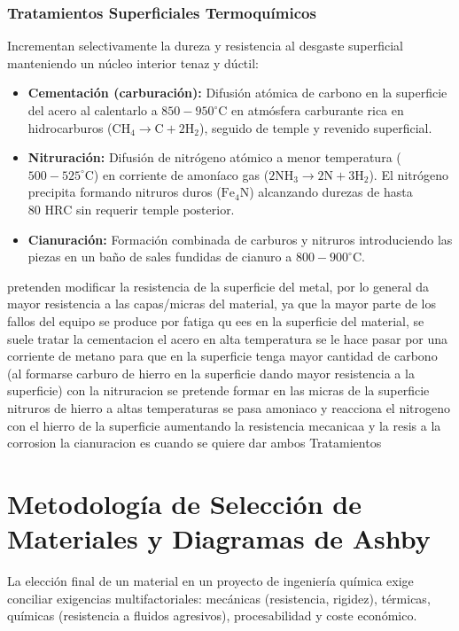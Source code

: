 \subsubsection{Tratamientos Superficiales Termoquímicos}
Incrementan selectivamente la dureza y resistencia al desgaste superficial manteniendo un núcleo interior tenaz y dúctil:
\begin{itemize}
    \item \textbf{Cementación (carburación):} Difusión atómica de carbono en la superficie del acero al calentarlo a $850 - 950^\circ\text{C}$ en atmósfera carburante rica en hidrocarburos ($\text{CH}_4 \rightarrow \text{C} + 2\text{H}_2$), seguido de temple y revenido superficial.
    \item \textbf{Nitruración:} Difusión de nitrógeno atómico a menor temperatura ($500 - 525^\circ\text{C}$) en corriente de amoníaco gas ($2\text{NH}_3 \rightarrow 2\text{N} + 3\text{H}_2$). El nitrógeno precipita formando nitruros duros ($\text{Fe}_4\text{N}$) alcanzando durezas de hasta $80\text{ HRC}$ sin requerir temple posterior.
    \item \textbf{Cianuración:} Formación combinada de carburos y nitruros introduciendo las piezas en un baño de sales fundidas de cianuro a $800 - 900^\circ\text{C}$.
\end{itemize}
pretenden modificar la resistencia de la superficie del metal, por lo general da mayor resistencia a las capas/micras del material, ya que la mayor parte de los fallos del equipo se produce por fatiga qu ees en la superficie del material, se suele tratar la cementacion el acero en alta temperatura se le hace pasar por una corriente de metano para que en la superficie tenga mayor cantidad de carbono (al formarse carburo de hierro en la superficie dando mayor resistencia a la superficie)
con la nitruracion se pretende formar en las micras de la superficie nitruros de hierro a altas temperaturas se pasa amoniaco y reacciona el nitrogeno con el hierro de la superficie aumentando la resistencia mecanicaa y la resis a la corrosion
la cianuracion es cuando se quiere dar ambos Tratamientos

\section{Metodología de Selección de Materiales y Diagramas de Ashby}

La elección final de un material en un proyecto de ingeniería química exige conciliar exigencias multifactoriales: mecánicas (resistencia, rigidez), térmicas, químicas (resistencia a fluidos agresivos), procesabilidad y coste económico.

